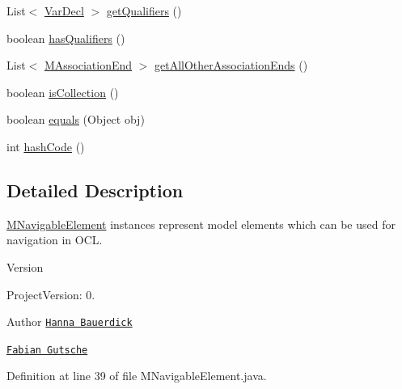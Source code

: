 \begin{DoxyCompactItemize}
\item 
List$<$ \hyperlink{classorg_1_1tzi_1_1use_1_1uml_1_1ocl_1_1expr_1_1_var_decl}{Var\-Decl} $>$ \hyperlink{interfaceorg_1_1tzi_1_1use_1_1uml_1_1mm_1_1_m_navigable_element_a2a0003edf256da9e5837f20fc2f657d8}{get\-Qualifiers} ()
\item 
boolean \hyperlink{interfaceorg_1_1tzi_1_1use_1_1uml_1_1mm_1_1_m_navigable_element_a4521f473c877b86b2fcc370b309acc53}{has\-Qualifiers} ()
\item 
List$<$ \hyperlink{classorg_1_1tzi_1_1use_1_1uml_1_1mm_1_1_m_association_end}{M\-Association\-End} $>$ \hyperlink{interfaceorg_1_1tzi_1_1use_1_1uml_1_1mm_1_1_m_navigable_element_a64eb92436bcf19157d0093ffbf170c7c}{get\-All\-Other\-Association\-Ends} ()
\item 
boolean \hyperlink{interfaceorg_1_1tzi_1_1use_1_1uml_1_1mm_1_1_m_navigable_element_ab1526b2fde5b5577a66562a28e25c6e4}{is\-Collection} ()
\item 
boolean \hyperlink{interfaceorg_1_1tzi_1_1use_1_1uml_1_1mm_1_1_m_navigable_element_a116687aab7b0a3566f0e0fad81889c3c}{equals} (Object obj)
\item 
int \hyperlink{interfaceorg_1_1tzi_1_1use_1_1uml_1_1mm_1_1_m_navigable_element_af3ddc5db8fffe9e075a7bcb4eaf3a60f}{hash\-Code} ()
\end{DoxyCompactItemize}


\subsection{Detailed Description}
\hyperlink{interfaceorg_1_1tzi_1_1use_1_1uml_1_1mm_1_1_m_navigable_element}{M\-Navigable\-Element} instances represent model elements which can be used for navigation in O\-C\-L.

\begin{DoxyVersion}{Version}

\end{DoxyVersion}
\begin{DoxyParagraph}{Project\-Version\-:}
0. 
\end{DoxyParagraph}
\begin{DoxyAuthor}{Author}
\href{mailto:hanna@tzi.de}{\tt Hanna Bauerdick} 

\href{mailto:gutsche@tzi.de}{\tt Fabian Gutsche} 
\end{DoxyAuthor}


Definition at line 39 of file M\-Navigable\-Element.\-java.



